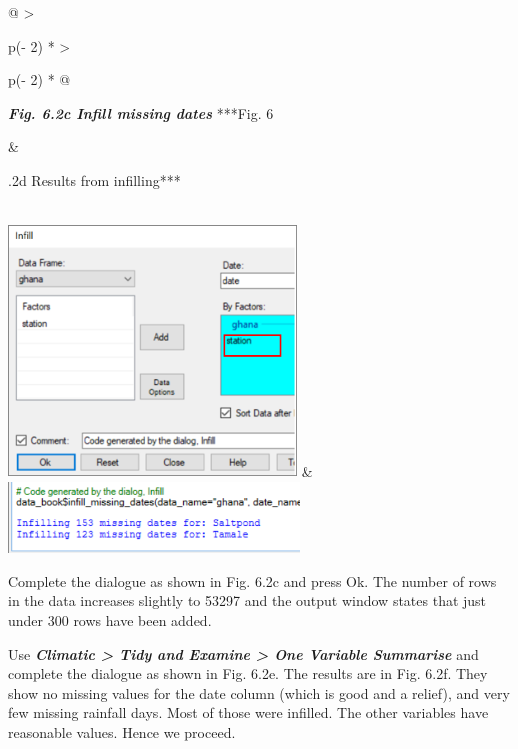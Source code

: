 \documentclass[
  letterpaper,
  DIV=11,
  numbers=noendperiod]{scrreprt}
\begin{document}
\begin{longtable}[]{@{}
  >{\raggedright\arraybackslash}p{(\columnwidth - 2\tabcolsep) * }
  >{\raggedright\arraybackslash}p{(\columnwidth - 2\tabcolsep) * }@{}}
\toprule\noalign{}
\begin{minipage}[b]{\linewidth}\raggedright
\textbf{\emph{Fig. 6.2c Infill missing dates}} ***Fig. 6
\end{minipage} & \begin{minipage}[b]{\linewidth}\raggedright
.2d Results from infilling***
\end{minipage} \\
\midrule\noalign{}
\endhead
\bottomrule\noalign{}
\endlastfoot
\includegraphics[width=3.01192in,height=2.63331in]{figures/Fig6.2c.png}
&
\includegraphics[width=3.04408in,height=0.74666in]{figures/Fig6.2d.png} \\
\end{longtable}

Complete the dialogue as shown in Fig. 6.2c and press Ok. The number of
rows in the data increases slightly to 53297 and the output window
states that just under 300 rows have been added.

Use \textbf{\emph{Climatic \textgreater{} Tidy and Examine
\textgreater{} One Variable Summarise}} and complete the dialogue as
shown in Fig. 6.2e. The results are in Fig. 6.2f. They show no missing
values for the date column (which is good and a relief), and very few
missing rainfall days. Most of those were infilled. The other variables
have reasonable values. Hence we proceed.
\end{document}
